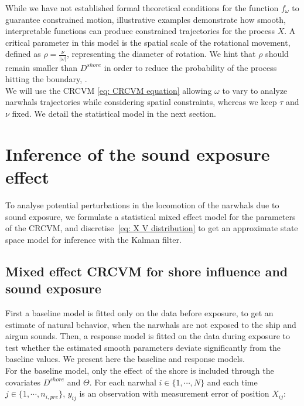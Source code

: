 \documentclass[aoas]{imsart}
\theoremstyle{definition}
\theoremstyle{remark}
\theoremstyle{remark}
\newcommand {\1}{\mathbb{1}}
\begin{document}
While we have not established formal theoretical conditions for the function $f_{\omega}$ to guarantee constrained motion,  illustrative examples demonstrate how smooth, interpretable functions can produce constrained trajectories for the process $X$. A critical parameter in this model is the spatial scale of the rotational movement, defined as $\rho=\frac{\nu}{\vert \omega \vert}$, representing the diameter of rotation. We hint that $\rho$ should remain smaller than $D^{shore}$ in order to reduce the probability of the process hitting the boundary, .\\


We will use the CRCVM \eqref{eq: CRCVM equation} allowing $\omega$ to vary to analyze narwhals trajectories while considering spatial constraints, whereas we keep $\tau$ and $\nu$ fixed. We detail the statistical model in the next section.






\section{Inference of the sound exposure effect}

To analyse potential perturbations in the locomotion of the narwhals due to sound exposure, we formulate a statistical mixed effect model for the parameters of the CRCVM, and discretise~\eqref{eq: X V distribution} to get an approximate state space model for inference with the Kalman filter.


\subsection{Mixed effect CRCVM for  shore influence and sound exposure}
\label{subsection: ship exposure effect}


First a baseline model is fitted only on the data before exposure, to get an estimate of natural behavior, when the narwhals are not exposed to the ship and airgun sounds. Then, a response model is fitted on the data during exposure to test whether the estimated smooth parameters deviate significantly from the baseline values. We present here the baseline and response models.\\

For the baseline model, only the effect of the shore is included through the covariates $D^{shore}$ and $\Theta$. For each narwhal $i \in \{1, \cdots, N\}$ and each time $j\in\{1, \cdots, n_{i,pre}\}$, $y_{ij}$ is an observation with measurement error of position $X_{ij}$:
\end{document}
